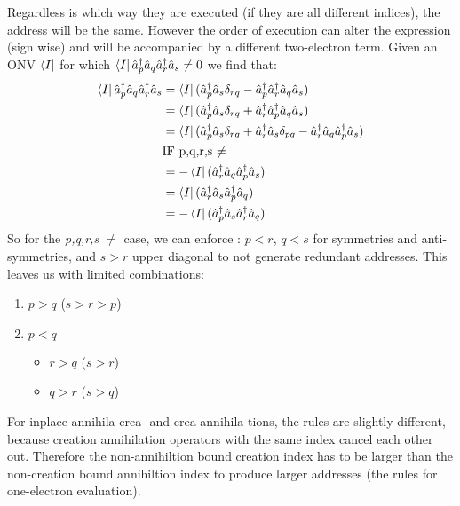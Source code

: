 \documentclass[12p]{article}
\begin{document}
Regardless is which way they are executed (if they are all different indices), the address will be the same. However the order of execution can alter the expression (sign wise) and will be accompanied by a different two-electron term. Given an ONV $\bra{I}$ for which $\bra{I} \hat{a}^\dagger_p \hat{a}_q \hat{a}^\dagger_r \hat{a}_s \neq 0 $ we find that:
\begin{align}
  \bra{I} \hat{a}^\dagger_p \hat{a}_q \hat{a}^\dagger_r \hat{a}_s & = \bra{I} (\hat{a}^\dagger_p \hat{a}_s \delta_{rq} - \hat{a}^\dagger_p \hat{a}^\dagger_r \hat{a}_q \hat{a}_s) \nonumber \\
  & = \bra{I} (\hat{a}^\dagger_p  \hat{a}_s \delta_{rq} + \hat{a}^\dagger_r \hat{a}^\dagger_p \hat{a}_q \hat{a}_s) \nonumber \\
  & = \bra{I} (\hat{a}^\dagger_p  \hat{a}_s \delta_{rq} + \hat{a}^\dagger_r \hat{a}_s \delta_{pq} - \hat{a}^\dagger_r \hat{a}_q \hat{a}^\dagger_p \hat{a}_s) \label{eq:equals} \\
  & \text{IF p,q,r,s $\neq$} \nonumber \\
  & = - \bra{I}(\hat{a}^\dagger_r \hat{a}_q \hat{a}^\dagger_p \hat{a}_s )\\
  & = \bra{I} (\hat{a}^\dagger_r \hat{a}_s \hat{a}^\dagger_p \hat{a}_q ) \\
  & = - \bra{I} (\hat{a}^\dagger_p \hat{a}_s \hat{a}^\dagger_r \hat{a}_q)
\end{align}
So for the \textit{p,q,r,s $\neq$} case, we can enforce : $p<r$, $q<s$ for symmetries and anti-symmetries, and $s > r$ upper diagonal to not generate redundant addresses. This leaves us with limited combinations:

\begin{enumerate}
  \item $p > q$ ($s > r > p$)
  \item $p < q$
  \begin{itemize}
    \item $r > q$ ($s > r$)
    \item $q > r$ ($s > q$)
  \end{itemize}
\end{enumerate}
For inplace annihila-crea- and crea-annihila-tions, the rules are slightly different, because creation annihilation operators with the same index cancel each other out. Therefore the non-annihiltion bound creation index has to be larger than the non-creation bound annihiltion index to produce larger addresses (the rules for one-electron evaluation).
\end{document}

